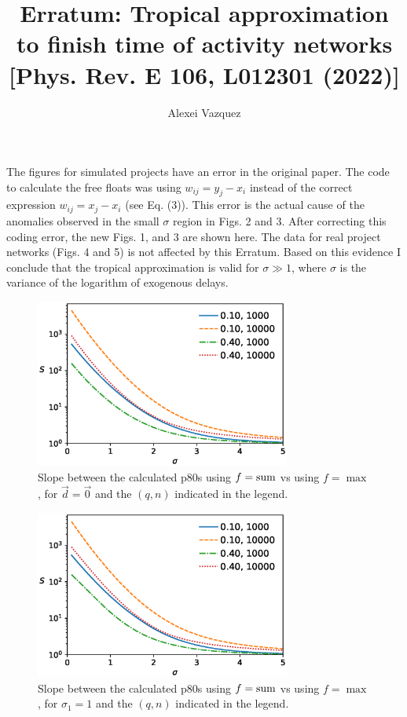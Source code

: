 \documentclass[reprint,aps,pre,amsmath,amssymb,superscriptaddress,showpacs]{revtex4-1}
\begin{document}
\title{Erratum: Tropical approximation to finish time of activity networks [Phys. Rev. E 106, L012301 (2022)]}

\author{Alexei Vazquez}

\maketitle
The figures for simulated projects have an error in the original paper. The code to calculate the free floats was using $w_{ij} = y_j - x_i$ instead of the correct expression $w_{ij} = x_j - x_i$ (see Eq. (3)). This error is the actual cause of the anomalies observed in the small $\sigma$ region in Figs. 2 and 3. After correcting this coding error,  the new Figs. 1, and 3 are shown here. The data for real project networks (Figs. 4 and 5) is not affected by this Erratum. Based on this evidence I conclude that the tropical approximation is valid for $\sigma\gg1$, where $\sigma$ is the variance of the logarithm of exogenous delays.

\begin{figure}[t]
\includegraphics[width=3.3in]{maxsum.scheduling.dupsplit.arc_distribution_zero.eps}
\caption{Slope between the calculated p80s using $f={\rm sum}$ vs using $f={\max}$, for $\vec{d}=\vec{0}$ and the $(q,n)$ indicated in the legend.}
\label{fig1}
\end{figure}

\begin{figure}[b]
\includegraphics[width=3.3in]{maxsum.scheduling.dupsplit.arc_distribution_lognormal.arc_sigma_1.eps}
\caption{Slope between the calculated p80s using $f={\rm sum}$ vs using $f={\max}$, for $\sigma_1=1$ and the $(q,n)$ indicated in the legend. }
\label{fig2}
\end{figure}
\end{document}
